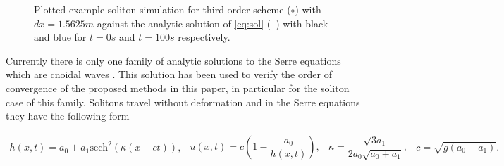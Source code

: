 \documentclass[SingleSpace,12pt]{Serre_ASCE}
\begin{document}
\begin{figure}[htb]
\centering
{}
\caption{Plotted example soliton simulation for third-order scheme ($\circ$) with $dx = 1.5625m$ against the analytic solution of \eqref{eq:sol} (\---) with black and blue for $t =0s$ and $t=100s$ respectively.}
\label{fig:solitoneo3}
\end{figure}
Currently there is only one family of analytic solutions to the Serre equations which are cnoidal waves \cite{Carter-Cienfuegos-2010-259}. This solution has been used to verify the order of convergence of the proposed methods in this paper, in particular for the soliton case of this family. Solitons travel without deformation and in the Serre equations they have the following form
\begin{linenomath*}
\begin{subequations}
\begin{gather}\label{eq:sol1}
h\left(x,t\right) = a_0 + a_1\text{sech}^2\left( \kappa\left(x - ct\right)\right),
\end{gather}
\begin{gather}\label{eq:sol2}
u\left(x,t\right) = c\left(1 - \dfrac{a_0}{h(x,t)} \right),
\end{gather}
\begin{gather}\label{eq:sol3}
\kappa = \dfrac{\sqrt{3a_1}}{2a_0 \sqrt{ a_0 + a_1}},
\end{gather}
\begin{gather}\label{eq:sol4}
c = \sqrt{g \left(a_0 + a_1\right)}.
\end{gather}
\end{subequations}
\label{eq:sol}
\end{linenomath*}
\end{document}
